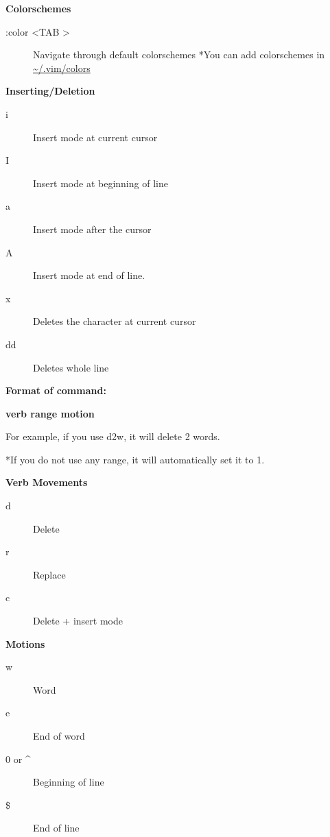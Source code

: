 \documentclass{article}
\begin{document}
\begin{multicols}{2}
\begin{center}
\Large\textbf{Colorschemes}
\end{center}
\begin{description}
\item[:color \textless TAB \textgreater] \hfill
Navigate through default colorschemes
\newline
*You can add colorschemes in \url{~/.vim/colors}
\end{description}

\columnbreak
\begin{center}
\Large\textbf{Inserting/Deletion}
\end{center}
\begin{description}
\item[i] \hfill
Insert mode at current cursor
\item[I] \hfill
Insert mode at beginning of line
\item[a] \hfill
Insert mode after the cursor
\item[A] \hfill
Insert mode at end of line.
\item[x] \hfill
Deletes the character at current cursor
\item[dd] \hfill
Deletes whole line
\end{description}
\end{multicols}

\textbf{Format of command:}
\begin{center}
\Large\textbf{verb range motion}
\end{center}
\begin{center}
\small{For example, if you use d2w, it will delete 2 words.}
\end{center}
\begin{center}
\small{*If you do not use any range, it will automatically set it to 1.}
\end{center}

\begin{multicols}{2}
\begin{center}
\Large\textbf{Verb Movements}
\end{center}
\begin{description}
\item[d] \hfill
Delete
\item[r] \hfill
Replace
\item[c] \hfill
Delete + insert mode
\end{description}

\columnbreak
\begin{center}
\Large\textbf{Motions}
\end{center}
\begin{description}
\item[w] \hfill
Word
\item[e] \hfill
End of word
\item[0 or \^] \hfill
Beginning of line
\item[\$] \hfill
End of line
\end{description}
\end{multicols}
\newpage
\end{document}

